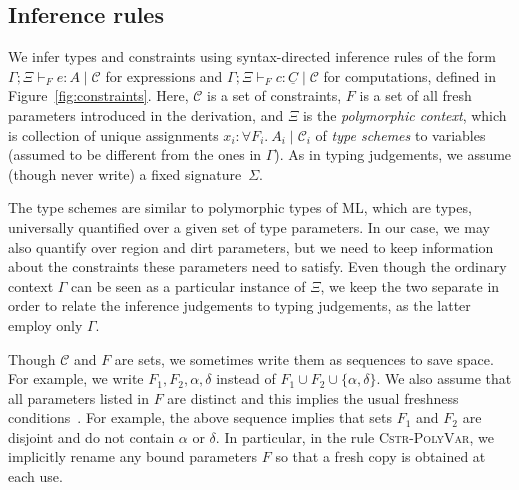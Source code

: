 \documentclass{LMCS}
\newcommand{\fra}[1]{\forall #1 .\ }
\newcommand{\rulename}[1]{{\mdseries \small \textsc{#1}}}
\newcommand{\set}[1]{\{ #1 \}}
\newcommand{\C}{\underline{C}}
\newcommand{\drt}{\delta}
\newcommand{\ctx}{\Gamma}
\newcommand{\pctx}{\Xi}
\newcommand{\ent}[1][]{\vdash_{#1}}
\newcommand{\T}{\mathrel{:}}
\newcommand{\while}{\mid}
\newcommand{\cstr}{\mathcal{C}}
\newcommand{\sig}{\Sigma}
\begin{document}
\subsection{Inference rules}
\label{sub:inference-rules}

We infer types and constraints using syntax-directed inference rules of the form
$\ctx; \pctx \ent[F] e \T A \while \cstr$ for expressions and
$\ctx; \pctx \ent[F] c \T \C \while \cstr$ for computations,
defined in Figure~\ref{fig:constraints}.
Here, $\cstr$ is a set of constraints,
$F$ is a set of all fresh parameters introduced in the derivation,
and $\pctx$ is the \emph{polymorphic context}, which is collection
of unique assignments $x_i \T \fra{F_i} A_i \while \cstr_i$ of
\emph{type schemes} to variables (assumed to be different from the ones in $\ctx$).
As in typing judgements, we assume (though never write) a fixed signature~$\sig$.

The type schemes are similar to polymorphic types of ML, which are types,
universally quantified over a given set of type parameters.
In our case, we may also quantify over region and dirt parameters,
but we need to keep information about the constraints these parameters need to satisfy.
Even though the ordinary context $\ctx$ can be seen as a particular instance of $\pctx$,
we keep the two separate in order to relate the inference judgements to typing judgements,
as the latter employ only $\ctx$.

Though $\cstr$ and $F$ are sets, we sometimes write them as sequences to save space.
For example, we write $F_1, F_2, \alpha, \drt$ instead of $F_1 \cup F_2 \cup \set{\alpha, \drt}$.
We also assume that all parameters listed in $F$ are distinct
and this implies the usual freshness conditions~\cite[p.~321]{pierce2002types}.
For example, the above sequence implies that sets $F_1$ and $F_2$
are disjoint and do not contain $\alpha$ or $\drt$.
In particular, in the rule \rulename{Cstr-PolyVar},
we implicitly rename any bound parameters $F$ so that a fresh copy is obtained at each use.
\end{document}
